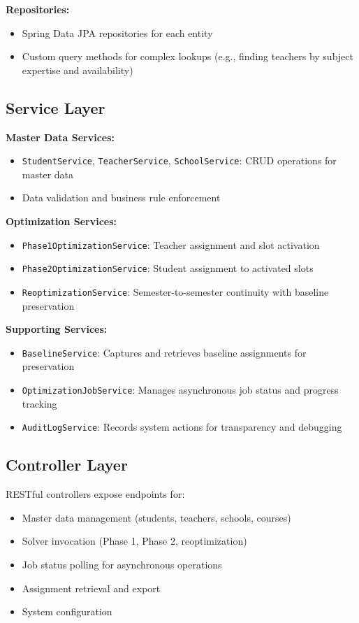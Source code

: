 \documentclass[12pt,a4paper]{report}
\begin{document}
\textbf{Repositories:}
\begin{itemize}
    \item Spring Data JPA repositories for each entity
    \item Custom query methods for complex lookups (e.g., finding teachers by subject expertise and availability)
\end{itemize}

\subsection{Service Layer}

\textbf{Master Data Services:}
\begin{itemize}
    \item \texttt{StudentService}, \texttt{TeacherService}, \texttt{SchoolService}: CRUD operations for master data
    \item Data validation and business rule enforcement
\end{itemize}

\textbf{Optimization Services:}
\begin{itemize}
    \item \texttt{Phase1OptimizationService}: Teacher assignment and slot activation
    \item \texttt{Phase2OptimizationService}: Student assignment to activated slots
    \item \texttt{ReoptimizationService}: Semester-to-semester continuity with baseline preservation
\end{itemize}

\textbf{Supporting Services:}
\begin{itemize}
    \item \texttt{BaselineService}: Captures and retrieves baseline assignments for preservation
    \item \texttt{OptimizationJobService}: Manages asynchronous job status and progress tracking
    \item \texttt{AuditLogService}: Records system actions for transparency and debugging
\end{itemize}

\subsection{Controller Layer}

RESTful controllers expose endpoints for:
\begin{itemize}
    \item Master data management (students, teachers, schools, courses)
    \item Solver invocation (Phase 1, Phase 2, reoptimization)
    \item Job status polling for asynchronous operations
    \item Assignment retrieval and export
    \item System configuration
\end{itemize}
\end{document}
